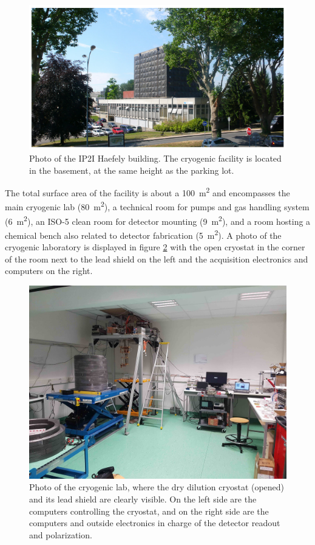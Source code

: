 \begin{figure}
\centering
\includegraphics[width=\textwidth,angle=0]{Figures/Experiment/haefely_building.png}
\caption{Photo of the IP2I Haefely building. The cryogenic facility is located in the basement, at the same height as the parking lot.}
\label{fig:haefely-building}
\end{figure}

The total surface area of the facility is about a \SI{100}{\m^2} and encompasses the main cryogenic lab (\SI{80}{\m^2}), a technical room for pumps and gas handling system (\SI{6}{\m^2}), an ISO-5 clean room for detector mounting (\SI{9}{\m^2}), and a room hosting a chemical bench also related to detector fabrication (\SI{5}{\m^2}). A photo of the cryogenic laboratory is displayed in figure \ref{fig:cryolab} with the open cryostat in the corner of the room next to the lead shield on the left and the acquisition electronics and computers on the right.

\begin{figure}
\begin{center}
\includegraphics[width=\textwidth,angle=0]{Figures/Experiment/ip2i_cryogenic_facility.jpg}
\caption{Photo of the cryogenic lab, where the dry dilution cryostat (opened) and its lead shield are clearly visible. On the left side are the computers controlling the cryostat, and on the right side are the computers and outside electronics in charge of the detector readout and polarization.}
\label{fig:cryolab}
\end{center}
\end{figure}

